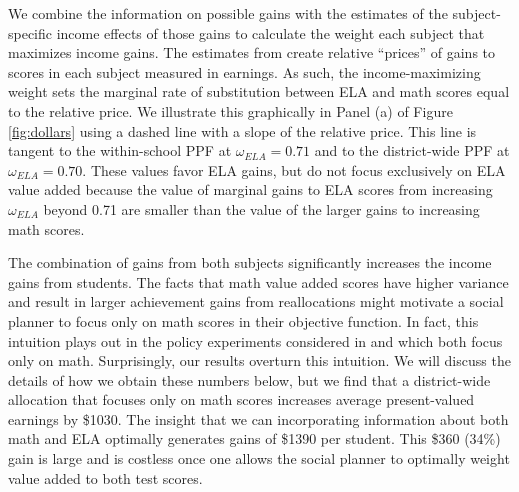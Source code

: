 \documentclass[12pt]{article}
\theoremstyle{definition}
\theoremstyle{definition}
\theoremstyle{definition}
\theoremstyle{definition}
\begin{document}
We combine the information on possible gains with the estimates of the subject-specific income effects of those gains to calculate the weight each subject that maximizes income gains. The estimates from \citet{chetty2014measuring1} create relative ``prices'' of gains to scores in each subject measured in earnings. As such, the income-maximizing weight sets the marginal rate of substitution between ELA and math scores equal to the relative price. We illustrate this graphically in Panel (a) of Figure \ref{fig:dollars} using a dashed line with a slope of the relative price. This line is tangent to the within-school PPF at $\omega_{ELA}=0.71$ and to the district-wide PPF at $\omega_{ELA}=0.70$. %
These values favor ELA gains, but do not focus exclusively on ELA value added because the value of marginal gains to ELA scores from increasing $\omega_{ELA}$ beyond 0.71 are smaller than the value of the larger gains to increasing math scores.


The combination of gains from both subjects significantly increases the income gains from students.
The facts that math value added scores have higher variance and result in larger achievement gains from reallocations might motivate a social planner to focus only on math scores in their objective function. In fact, this intuition plays out in the policy experiments considered in \citet{Delgado2020} and \citet{bates2022teacher} which both focus only on math. Surprisingly, our results overturn this intuition. We will discuss the details of how we obtain these numbers below, but we find that a district-wide allocation that focuses only on math scores increases average present-valued earnings by \$1030. The insight that we can incorporating information about both math and ELA optimally generates gains of \$1390 per student. This \$360 (34\%) gain is large and is costless once one allows the social planner to optimally weight value added to both test scores.
\end{document}
